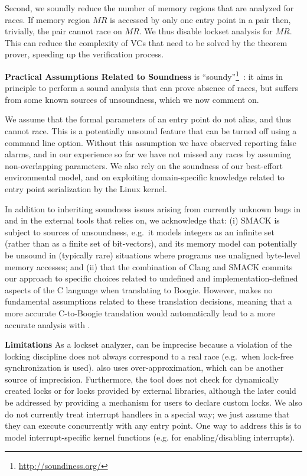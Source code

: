 Second, we soundly reduce the number of memory regions that are analyzed for races.  If memory region $\mathit{MR}$ is accessed by only one entry point in a pair then, trivially, the pair cannot race on $\mathit{MR}$.  We thus disable lockset analysis for $\mathit{MR}$.  This can reduce the complexity of VCs that need to be solved by the theorem prover, speeding up the verification process.

\noindent\textbf{Practical Assumptions Related to Soundness}
%
\whoop is ``soundy''\footnote{\url{http://soundiness.org/}}~\cite{soundiness}: it aims in principle to perform a sound analysis that can prove absence of races, but suffers from some known sources of unsoundness, which we now comment on.

We assume that the formal parameters of an entry point do not alias, and thus cannot race. This is a potentially unsound feature that can be turned off using a command line option.  Without this assumption we have observed \whoop reporting false alarms, and in our experience so far we have not missed any races by assuming non-overlapping parameters.  We also rely on the soundness of our best-effort environmental model, and on exploiting domain-specific knowledge related to entry point serialization by the Linux kernel.

In addition to inheriting soundness issues arising from currently unknown bugs in \whoop and in the external tools that \whoop relies on, we acknowledge that: (i) SMACK is subject to sources of unsoundness, e.g.\ it models integers as an infinite set (rather than as a finite set of bit-vectors), and its memory model can potentially be unsound in (typically rare) situations where programs use unaligned byte-level memory accesses; and (ii) that the combination of Clang and SMACK commits our approach to specific choices related to undefined and implementation-defined aspects of the C language when translating to Boogie.  However, \whoop makes no fundamental assumptions related to these translation decisions, meaning that a more accurate C-to-Boogie translation would automatically lead to a more accurate analysis with \whoop.

\noindent\textbf{Limitations }
%
As a lockset analyzer, \whoop can be imprecise because a violation of the locking discipline does not always correspond to a real race (e.g.\ when lock-free synchronization is used). \whoop also uses over-approximation, which can be another source of imprecision. Furthermore, the tool does not check for dynamically created locks or for locks provided by external libraries, although the later could be addressed by providing a mechanism for users to declare custom locks. We also do not currently treat interrupt handlers in a special way; we just assume that they can execute concurrently with any entry point. One way to address this is to model interrupt-specific kernel functions (e.g. for enabling/disabling interrupts).

